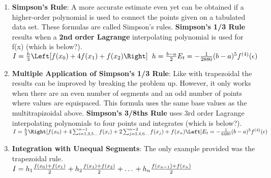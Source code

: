 \documentclass[fontsize=5pt]{scrartcl}
\begin{document}
\begin{multicols}{3}
\begin{enumerate}
      \item \textbf{Simpson's Rule}: A more accurate estimate even yet can be obtained if a higher-order polynomial is used
      to connect the points given on a tabulated data set. These formulas are called Simpson's rules. \textbf{Simpson's 1/3 Rule}
      results when a \textbf{2nd order Lagrange} interpolating polynomial is used for f(x) (which is below?). \\
      \begin{math}
        I=\frac{h}{3}\Left[f(x_0)+4f(x_1)+f(x_2)\Right]\hspace{2mm}h=\frac{b-a}{2} \\
        E_t=-\frac{1}{2880}(b-a)^5f^{(4)}(\epsilon)
      \end{math}

      \item \textbf{Multiple Application of Simpson's 1/3 Rule}: Like with trapezoidal the results can be improved
        by breaking the problem up. However, it only works when there are an even number of segments and an odd number
        of points where values are equispaced. This formula uses the same base values as the multitrapizoidal above.
        \textbf{Simpson's 3/8ths Rule} uses 3rd order Lagrange interpolating polynomials to four points and integrates
        (which is below?). \\
        
        \begin{math}
          I=\frac{h}{3}\Right[f(x_0)+4\sum_{i=1,3,5...}^{n-1}f(x_i)+ \\ 2\sum_{j=2,4,6...}^{n-2}f(x_j)+f(x_n)\Left]
          E_t=-\frac{1}{6480}(b-a)^5f^{(4)}(\epsilon)
        \end{math}

      
      \item \textbf{Integration with Unequal Segments}: The only example provided was the trapezoidal rule. \\
        \begin{math}
          I=h_1\frac{f(x_0)+f(x_1)}{2}+h_2\frac{f(x_1)+f(x_2)}{2}+\ldots \\
          +h_n\frac{f(x_{n-1})+f(x_{n})}{2}
        \end{math}


\end{enumerate}
\end{multicols}
\end{document}
